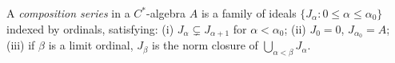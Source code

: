 A \emph{composition series} in a $C^*$-algebra $A$ is a family of ideals $\{J_\alpha : 0 \leqslant \alpha \leqslant \alpha_0\}$ indexed by ordinals, satisfying: (i) $J_\alpha \subsetneq J_{\alpha+1}$ for $\alpha < \alpha_0$; (ii) $J_0 = 0$, $J_{\alpha_0} = A$; (iii) if $\beta$ is a limit ordinal, $J_\beta$ is the norm closure of $\bigcup_{\alpha < \beta} J_\alpha$.
